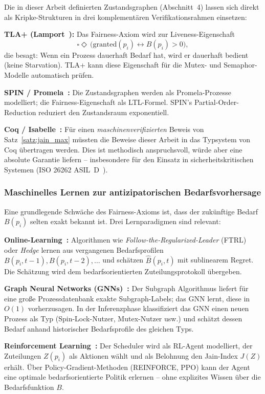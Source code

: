 ﻿\documentclass[a4paper,12pt]{article}
\theoremstyle{definition}
\begin{document}
Die in dieser Arbeit definierten Zustandsgraphen (Abschnitt~4)
lassen sich direkt als Kripke-Strukturen in drei komplementären
Verifikationsrahmen einsetzen:

\textbf{TLA+ (Lamport~\cite{lamport2002tla}):} Das Fairness-Axiom
wird zur Liveness-Eigenschaft
\[
  \square \Diamond\, \bigl(\mathrm{granted}(p_i)
  \leftrightarrow B(p_i) > 0\bigr),
\]
die besagt: Wenn ein Prozess dauerhaft Bedarf hat, wird er
dauerhaft bedient (keine Starvation). TLA+ kann diese
Eigenschaft für die Mutex- und Semaphor-Modelle automatisch
prüfen.

\textbf{SPIN / Promela~\cite{holzmann2004spin}:} Die
Zustandsgraphen werden als Promela-Prozesse modelliert;
die Fairness-Eigenschaft als LTL-Formel. SPIN's Partial-Order-Reduction
reduziert den Zustandsraum exponentiell.

\textbf{Coq / Isabelle~\cite{bertot2004coq}:} Für einen
\emph{maschinenverifizierten} Beweis von Satz~\ref{satz:jain_max}
müssten die Beweise dieser Arbeit in das Typsystem von Coq
übertragen werden. Dies ist methodisch anspruchsvoll, würde
aber eine absolute Garantie liefern -- insbesondere für den
Einsatz in sicherheitskritischen Systemen (ISO 26262
ASIL~D~\cite{iso26262}).

\subsubsection{Maschinelles Lernen zur antizipatorischen
Bedarfsvorhersage}

Eine grundlegende Schwäche des Fairness-Axioms ist, dass der
zukünftige Bedarf $B(p_i)$ selten exakt bekannt ist.
Drei Lernparadigmen sind relevant:

\textbf{Online-Learning~\cite{cesa2006prediction}:}
Algorithmen wie \emph{Follow-the-Regularized-Leader} (FTRL)
oder \emph{Hedge} lernen aus vergangenen Bedarfsprofilen
$B(p_i, t-1), B(p_i, t-2), \ldots$ und schätzen
$\hat{B}(p_i, t)$ mit sublinearem Regret. Die Schätzung
wird dem bedarfsorientierten Zuteilungsprotokoll übergeben.

\textbf{Graph Neural Networks (GNNs)~\cite{scarselli2009graph}:}
Der Subgraph Algorithmus liefert für eine große Prozessdatenbank
exakte Subgraph-Labels; das GNN lernt, diese in $O(1)$
vorherzusagen. In der Inferenzphase klassifiziert das GNN
einen neuen Prozess als Typ (Spin-Lock-Nutzer,
Mutex-Nutzer usw.) und schätzt dessen Bedarf anhand
historischer Bedarfsprofile des gleichen Typs.

\textbf{Reinforcement Learning~\cite{sutton2018reinforcement}:}
Der Scheduler wird als RL-Agent modelliert, der Zuteilungen
$Z(p_i)$ als Aktionen wählt und als Belohnung den
Jain-Index $J(Z)$ erhält. Über Policy-Gradient-Methoden
(REINFORCE, PPO) kann der Agent eine optimale
bedarfsorientierte Politik erlernen -- ohne explizites
Wissen über die Bedarfsfunktion $B$.
\end{document}
